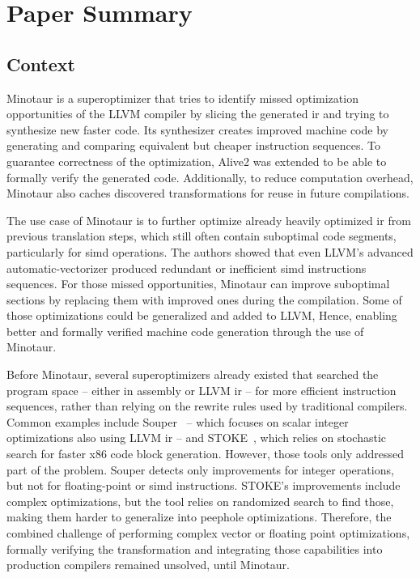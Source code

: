  	\section{Paper Summary}
 	\subsection{Context}
 	Minotaur is a superoptimizer that tries to identify missed optimization opportunities of the LLVM compiler by slicing the generated \gls*{ir} and trying to synthesize new faster code.
	Its synthesizer creates improved machine code by generating and comparing equivalent but cheaper instruction sequences.
	To guarantee correctness of the optimization, Alive2 was extended to be able to formally verify the generated code.
	Additionally, to reduce computation overhead, Minotaur also caches discovered transformations for reuse in future compilations.
 	
 	The use case of Minotaur is to further optimize already heavily optimized \gls*{ir} from previous translation steps, which still often contain suboptimal code segments, particularly for \gls*{simd} operations.
	The authors showed that even LLVM's advanced automatic-vectorizer produced redundant or inefficient \gls*{simd} instructions sequences.
	For those missed opportunities, Minotaur can improve suboptimal sections by replacing them with improved ones during the compilation.
	Some of those optimizations could be generalized and added to LLVM,
	Hence, enabling better and formally verified machine code generation through the use of Minotaur.
 	
	Before Minotaur, several superoptimizers already existed that searched the program space -- either in assembly or LLVM \gls*{ir} -- for more efficient instruction sequences, rather than relying on the rewrite rules used by traditional compilers. 
	Common examples include Souper~\cite{DBLP:souper} -- which focuses on scalar integer optimizations also using LLVM \gls*{ir} -- and STOKE~\cite{DBLP:stoke}, which relies on stochastic search for faster x86 code block generation.
	However, those tools only addressed part of the problem.
	Souper detects only improvements for integer operations, but not for floating-point or \gls*{simd} instructions.
	STOKE's improvements include complex optimizations, but the tool relies on randomized search to find those, making them harder to generalize into peephole optimizations.
	Therefore, the combined challenge of performing complex vector or floating point optimizations, formally verifying the transformation and integrating those capabilities into production compilers remained unsolved, until Minotaur. 
 	
